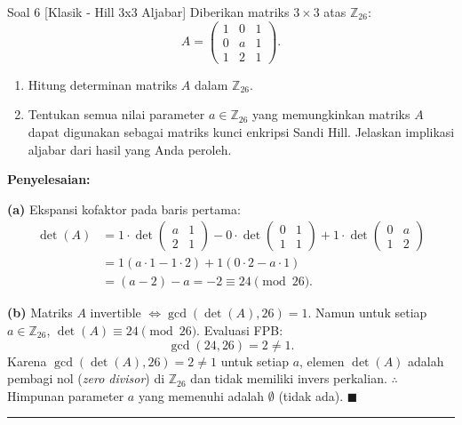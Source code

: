 \documentclass[11pt,a4paper]{article}
\newenvironment{solusi}{\noindent\textbf{\textsf{Penyelesaian:}}\par\vspace{0.2em}}{\hfill$\blacksquare$\vspace{1em}\par\hrule\vspace{1em}}
\begin{document}
\begin{soalklasik}{Soal 6 [Klasik - Hill 3x3 Aljabar]}
Diberikan matriks $3 \times 3$ atas $\mathbb{Z}_{26}$:
\[
A = \begin{pmatrix} 1 & 0 & 1 \\ 0 & a & 1 \\ 1 & 2 & 1 \end{pmatrix}.
\]
\begin{enumerate}[label=(\alph*)]
    \item Hitung determinan matriks $A$ dalam $\mathbb{Z}_{26}$.
    \item Tentukan semua nilai parameter $a \in \mathbb{Z}_{26}$ yang memungkinkan matriks $A$ dapat digunakan sebagai matriks kunci enkripsi Sandi Hill. Jelaskan implikasi aljabar dari hasil yang Anda peroleh.
\end{enumerate}
\end{soalklasik}

\begin{solusi}
\textbf{(a)} Ekspansi kofaktor pada baris pertama:
\begin{align*}
\det(A) &= 1 \cdot \det\begin{pmatrix} a & 1 \\ 2 & 1 \end{pmatrix} - 0 \cdot \det\begin{pmatrix} 0 & 1 \\ 1 & 1 \end{pmatrix} + 1 \cdot \det\begin{pmatrix} 0 & a \\ 1 & 2 \end{pmatrix} \\
&= 1(a \cdot 1 - 1 \cdot 2) + 1(0 \cdot 2 - a \cdot 1) \\
&= (a - 2) - a = -2 \equiv 24 \pmod{26}.
\end{align*}

\textbf{(b)} Matriks $A$ invertible $\iff \gcd(\det(A), 26) = 1$.
Namun untuk setiap $a \in \mathbb{Z}_{26}$, $\det(A) \equiv 24 \pmod{26}$.
Evaluasi FPB:
\[
\gcd(24, 26) = 2 \ne 1.
\]
Karena $\gcd(\det(A), 26) = 2 \ne 1$ untuk setiap $a$, elemen $\det(A)$ adalah pembagi nol (\textit{zero divisor}) di $\mathbb{Z}_{26}$ dan tidak memiliki invers perkalian.
$\therefore$ Himpunan parameter $a$ yang memenuhi adalah $\emptyset$ (tidak ada).
\end{solusi}
\end{document}
